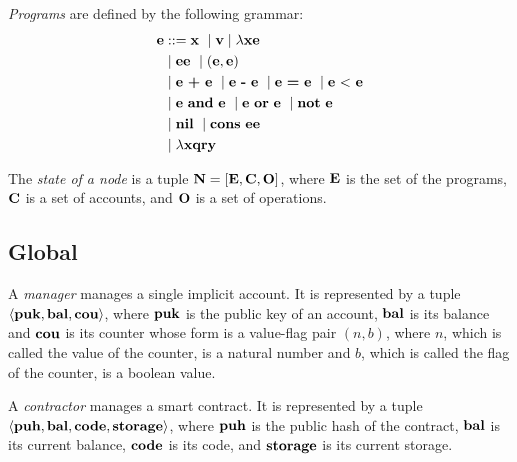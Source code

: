 \documentclass[a4paper]{llncs}
\begin{document}
\begin{definition}%
\emph{Programs} are defined by the following grammar:
\begin{align*}
	\PROGRAM & :: =  \VARIABLE\ \mid \VALUE \mid \lambda \VARIABLE \PROGRAM\ 
	\\&\mid \PROGRAM\PROGRAM\ \mid (\PROGRAM,\PROGRAM) 	%
	\\&\mid \PROGRAM\ \PLUS\ \PROGRAM\ \mid \PROGRAM\ \MINUS\ \PROGRAM\ \mid \PROGRAM\ \EQUAL\ \PROGRAM\ \mid \PROGRAM\ \LESS\ \PROGRAM
	\\&\mid \PROGRAM\ \AND\ \PROGRAM\ \mid \PROGRAM\ \OR\ \PROGRAM\ \mid \NOT\ \PROGRAM
	\\&\mid \NIL\ \mid \CONS\ \PROGRAM \PROGRAM
	\\&\mid \lambda \VARIABLE\QRY
\end{align*}
\end{definition}

\begin{definition}%
  The \emph{state of a node} is a tuple
  $\textbf{N} = [ \textbf{E}, \textbf{C}, \textbf{O}]$, where $\textbf{E}$ is the set of the programs, $\textbf{C}$ is a set of
  accounts, and
  $\textbf{O}$ is a set of operations.
\end{definition}


\subsection{Global}
\label{sec:global}



\begin{definition}%
A \emph{manager} manages a single implicit account. It is represented by a
tuple $\langle  \textbf{puk}, \textbf{bal}, \textbf{cou} \rangle $, where  $\textbf{puk}$ is the
public key of an account, $\textbf{bal}$ is its
balance and $\textbf{cou}$ is its counter whose form is a value-flag pair $(n, b)$, where $n$, which is called the value of the counter,  is a natural number and ${b}$, which is called the flag of the counter, is a boolean value.  
\end{definition}

\begin{definition}%
  A \emph{contractor} manages a smart contract. It is
  represented by a tuple
  $\langle \textbf{puh}, \textbf{bal}, \textbf{code}, \textbf{storage} \rangle $, where $\textbf{puh}$ is the
  public hash of the contract, $\textbf{bal}$ is its current balance, $\textbf{code}$ is its
  code, and $\textbf{storage}$ is its current storage.
\end{definition}
\end{document}
